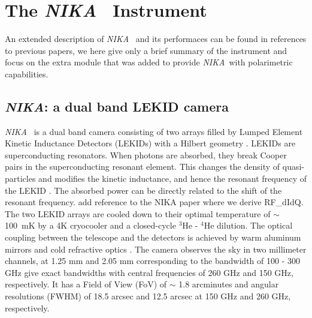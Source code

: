 \documentclass[twocolumn,traditabstract]{aa}
\newcommand{\nika}{{\it NIKA}}
\begin{document}
{\color{blue}
\section{The \nika~ Instrument}
\label{nika instrument}

An extended description of \nika~ and its performaces can be found
in {\color{red} references to previous papers}, we here give only a brief
summary of the instrument and focus on the extra module that was added to
provide \nika~with polarimetric capabilities.

\subsection{\nika: a dual band LEKID camera}
 \nika~ is a dual band camera
\citep{monfardini2010} consisting of two arrays filled by Lumped Element Kinetic
Inductance Detectors (LEKIDs) with a Hilbert geometry \citep{roesch}. LEKIDs are
superconducting resonators. When photons are absorbed, they break Cooper pairs
in the superconducting resonant element. This changes the density of
quasi-particles and modifies the kinetic inductance, and hence the resonant
frequency of the LEKID \citep{Doyle2008}. The absorbed power can be directly
related to the shift of the resonant frequency. {\color{Red} add reference to
  the NIKA paper where we derive RF\_dIdQ}. The two LEKID arrays are cooled down
to their optimal temperature of $\sim$ 100~mK by a 4K cryocooler and a
closed-cycle $^3$He - $^4$He dilution. The optical coupling between the
telescope and the detectors is achieved by warm aluminum mirrors and cold
refractive optics \citep{catalano2014}. The camera observes the sky in two
millimeter channels, at 1.25 mm and 2.05 mm corresponding to the bandwidth of
100 - 300 GHz {\color{red} give exact bandwidths} with central frequencies of
260 GHz and 150 GHz, respectively. It has a Field of View (FoV) of $\sim$ 1.8
arcminutes and angular resolutions (FWHM) of 18.5 arcsec and 12.5 arcsec at 150
GHz and 260 GHz, respectively.


}
\end{document}
